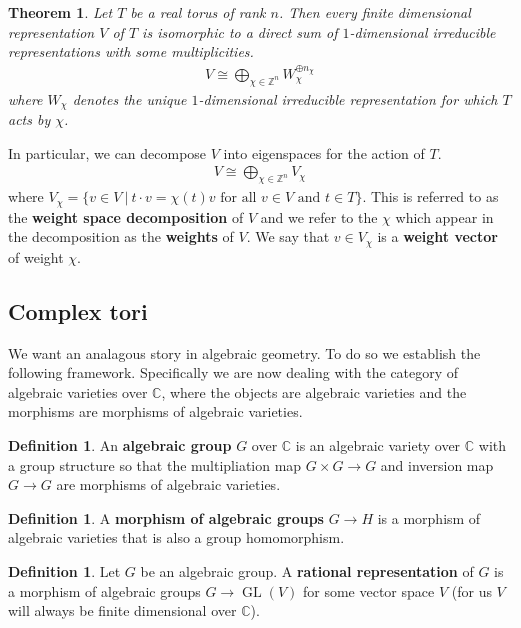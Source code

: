 \documentclass[manuscript, printscheme]{aomart}
\theoremstyle{plain} %
\newtheorem{theorem}[equation]{Theorem}
\theoremstyle{definition}
\newtheorem{definition}[equation]{Definition}
\theoremstyle{remark}
\newcommand{\st}{\ \vert \ }
\DeclareMathOperator{\GL}{GL}
\newcommand{\C}{\mathbb{C}}
\newcommand{\Z}{\mathbb{Z}}
\newcommand{\set}[1]{\{#1\}}
\begin{document}
\begin{theorem}
	Let $T$ be a real torus of rank $n$. Then every finite dimensional representation $V$ of $T$ is isomorphic
	to a direct sum of $1$-dimensional irreducible representations with some multiplicities.
	\begin{align*}
		V \cong \bigoplus_{\chi\in \Z^n} W_\chi^{\oplus n_\chi}
	\end{align*} where $W_\chi$ denotes the unique $1$-dimensional irreducible representation for which $T$ acts by $\chi$.
\end{theorem}

In particular, we can decompose $V$ into eigenspaces for the action of $T$. \begin{align*}
	V \cong \bigoplus_{\chi\in\Z^n} V_\chi
\end{align*} where $V_\chi = \set{v\in V \st t\cdot v = \chi(t)v \text{ for all $v\in V$ and $t\in T$}}$. This is
referred to as the \textbf{weight space decomposition} of $V$ and we refer to the $\chi$ which appear in
the decomposition as the \textbf{weights} of $V$.
We say that $v\in V_\chi$ is a \textbf{weight vector} of weight $\chi$.


\subsection{Complex tori}
We want an analagous story in algebraic geometry. To do so we establish the following framework.
Specifically we are now dealing with the category of algebraic varieties over $\C$, where the objects are algebraic varieties
and the morphisms are morphisms of algebraic varieties. 
\begin{definition}
	An \textbf{algebraic group} $G$ over $\C$ is an algebraic variety over $\C$ with a group structure
	so that the multipliation map $G\times G\to G$ and inversion map $G\to G$ are morphisms
	of algebraic varieties.
\end{definition}

\begin{definition}
	A \textbf{morphism of algebraic groups} $G\to H$ is a morphism of algebraic varieties that is also a group homomorphism.
\end{definition}

\begin{definition}
	Let $G$ be an algebraic group. A \textbf{rational representation} of $G$ is a morphism of algebraic groups
	$G\to \GL(V)$ for some vector space $V$ (for us $V$ will always be finite dimensional over $\C$).
\end{definition}
\end{document}
